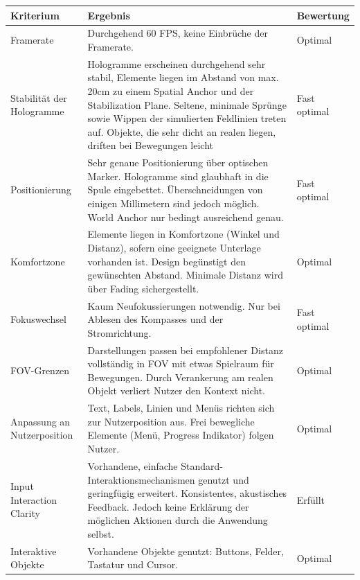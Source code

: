 \begin{landscape}
	\bgroup
	\setlength\extrarowheight{-2pt}
	\def\arraystretch{1.8}
	\begin{table}
		\centering
		\begin{tabular}{m{2.3cm}|m{15.5cm}|m{2cm}}
			Kriterium & Ergebnis & Bewertung\\
			\hline
			\hline
			Framerate & Durchgehend 60 FPS, keine Einbrüche der Framerate. & Optimal\\
			\hline
			Stabilität der Hologramme & Hologramme erscheinen durchgehend sehr stabil, Elemente liegen im Abstand von max. 20cm zu einem Spatial Anchor und der Stabilization Plane. Seltene, minimale Sprünge sowie Wippen der simulierten Feldlinien treten auf. Objekte, die sehr dicht an realen liegen, driften bei Bewegungen leicht & Fast optimal\\
			\hline
			Positionierung & Sehr genaue Positionierung über optischen Marker. Hologramme sind glaubhaft in die Spule eingebettet. Überschneidungen von einigen Millimetern sind jedoch möglich. World Anchor nur bedingt ausreichend genau.& Fast optimal\\
			\hline
			Komfortzone & Elemente liegen in Komfortzone (Winkel und Distanz), sofern eine geeignete Unterlage vorhanden ist. Design begünstigt den gewünschten Abstand. Minimale Distanz wird über Fading sichergestellt. & Optimal\\
			\hline
			Fokuswechsel & Kaum Neufokussierungen notwendig. Nur bei Ablesen des Kompasses und der Stromrichtung. & Fast optimal\\
			\hline
			FOV-Grenzen & Darstellungen passen bei empfohlener Distanz vollständig in FOV mit etwas Spielraum für Bewegungen. Durch Verankerung am realen Objekt verliert Nutzer den Kontext nicht. & Optimal\\
			\hline
			Anpassung an Nutzerposition & Text, Labels, Linien und Menüs richten sich zur Nutzerposition aus. Frei bewegliche Elemente (Menü, Progress Indikator) folgen Nutzer. & Optimal\\
			\hline
			Input Interaction Clarity & Vorhandene, einfache Standard-Interaktionsmechanismen genutzt und geringfügig erweitert. Konsistentes, akustisches Feedback. Jedoch keine Erklärung der möglichen Aktionen durch die Anwendung selbst. & Erfüllt\\
			\hline
			Interaktive Objekte & Vorhandene Objekte genutzt: Buttons, Felder, Tastatur und Cursor. & Optimal\\

\end{tabular}
\end{table}
\end{landscape}
